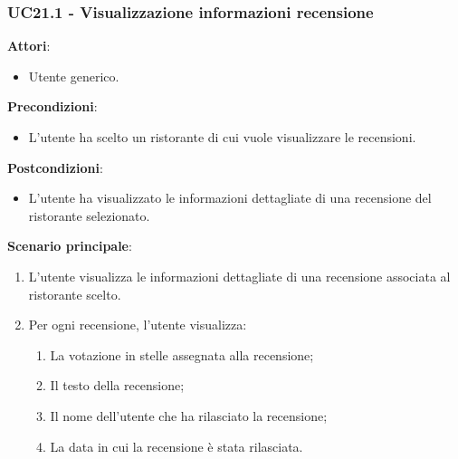 \subsubsection{UC21.1 - Visualizzazione informazioni recensione}\label{usecase:21_1}
\textbf{Attori}:
\begin{itemize}
    \item Utente generico.
\end{itemize}
\textbf{Precondizioni}:
\begin{itemize}
    \item L'utente ha scelto un ristorante di cui vuole visualizzare le recensioni.
\end{itemize}
\textbf{Postcondizioni}:
\begin{itemize}
    \item L'utente ha visualizzato le informazioni dettagliate di una recensione del ristorante selezionato.
\end{itemize}
\textbf{Scenario principale}:
\begin{enumerate}
    \item L'utente visualizza le informazioni dettagliate di una recensione associata al ristorante scelto.
    \item Per ogni recensione, l'utente visualizza:
    \begin{enumerate}
        \item La votazione in stelle assegnata alla recensione;
        \item Il testo della recensione;
        \item Il nome dell'utente che ha rilasciato la recensione;
        \item La data in cui la recensione è stata rilasciata.
    \end{enumerate}
\end{enumerate}

\newpage